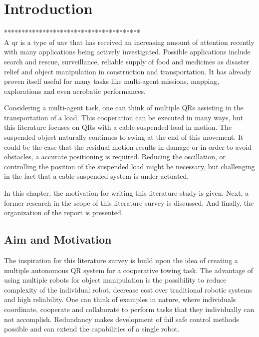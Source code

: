     \chapter{Introduction} \label{ch:intro}

    ***************************************\\
    		A \acf{qr} is a type of \acf{uav} that has received an increasing amount of attention recently with many applications being actively investigated. Possible applications include search and rescue, surveillance, reliable supply of food and medicines as disaster relief and object manipulation in construction and transportation. It has already proven itself useful for many tasks like multi-agent missions, mapping, explorations and even acrobatic performances.
    
    		Considering a multi-agent task, one can think of multiple QRs assisting in the transportation of a load. This cooperation can be executed in many ways, but this literature focuses on QRs with a cable-suspended load in motion. The suspended object naturally continues to swing at the end of this movement. It could be the case that the residual motion results in damage or in order to avoid obstacles, a accurate positioning is required. Reducing the oscillation, or controlling the position of the suspended load might be necessary, but challenging in the fact that a cable-suspended system is under-actuated.
    
    		In this chapter, the motivation for writing this literature study is given. Next, a former research in the scope of this literature survey is discussed. And finally, the organization of the report is presented.
    
    		\section{Aim and Motivation}\label{sec:int.motivation}
    				The inspiration for this literature survey is build upon the idea of creating a multiple autonomous QR system for a cooperative towing task. The advantage of using multiple robots for object manipulation is the possibility to reduce complexity of the individual robot, decrease cost over traditional robotic systems and high reliability. One can think of examples in nature, where individuals coordinate, cooperate and collaborate to perform tasks that they individually can not accomplish. Redundancy makes development of fail safe control methods possible and can extend the capabilities of a single robot. 						
    				
